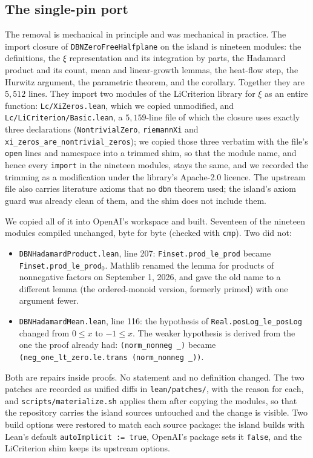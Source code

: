 \documentclass[11pt]{article}
\theoremstyle{definition}
\newcommand{\lean}[1]{\texttt{#1}}
\begin{document}
\subsection{The single-pin port}

The removal is mechanical in principle and was mechanical in practice. The import closure of \lean{DBNZeroFreeHalfplane} on the island is nineteen modules: the definitions, the $\xi$ representation and its integration by parts, the Hadamard product and its count, mean and linear-growth lemmas, the heat-flow step, the Hurwitz argument, the parametric theorem, and the corollary. Together they are $5{,}512$ lines. They import two modules of the LiCriterion library \cite{LiCrit} for $\xi$ as an entire function: \lean{Lc/XiZeros.lean}, which we copied unmodified, and \lean{Lc/LiCriterion/Basic.lean}, a $5{,}159$-line file of which the closure uses exactly three declarations (\lean{NontrivialZero}, \lean{riemannXi} and \lean{xi\_zeros\_are\_nontrivial\_zeros}); we copied those three verbatim with the file's \lean{open} lines and namespace into a trimmed shim, so that the module name, and hence every \lean{import} in the nineteen modules, stays the same, and we recorded the trimming as a modification under the library's Apache-2.0 licence. The upstream file also carries literature axioms that no \lean{dbn} theorem used; the island's axiom guard was already clean of them, and the shim does not include them.

We copied all of it into OpenAI's workspace and built. Seventeen of the nineteen modules compiled unchanged, byte for byte (checked with \lean{cmp}). Two did not:

\begin{itemize}[leftmargin=*]
\item \lean{DBNHadamardProduct.lean}, line 207: \lean{Finset.prod\_le\_prod} became \lean{Finset.prod\_le\_prod$_0$}. Mathlib renamed the lemma for products of nonnegative factors on September 1, 2026, and gave the old name to a different lemma (the ordered-monoid version, formerly primed) with one argument fewer.
\item \lean{DBNHadamardMean.lean}, line 116: the hypothesis of \lean{Real.posLog\_le\_posLog} changed from $0 \le x$ to $-1 \le x$. The weaker hypothesis is derived from the one the proof already had: \lean{(norm\_nonneg \_)} became \lean{(neg\_one\_lt\_zero.le.trans (norm\_nonneg \_))}.
\end{itemize}

Both are repairs inside proofs. No statement and no definition changed. The two patches are recorded as unified diffs in \lean{lean/patches/}, with the reason for each, and \lean{scripts/materialize.sh} applies them after copying the modules, so that the repository carries the island sources untouched and the change is visible. Two build options were restored to match each source package: the island builds with Lean's default \lean{autoImplicit := true}, OpenAI's package sets it \lean{false}, and the LiCriterion shim keeps its upstream options.
\end{document}
